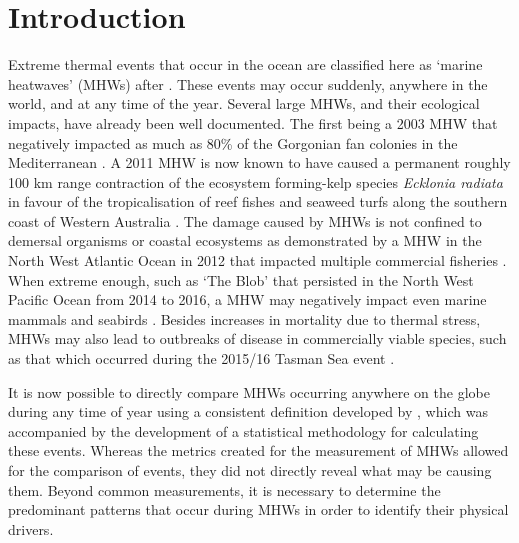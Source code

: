 \documentclass[utf8]{frontiersSCNS}
\begin{document}
\section{Introduction}
Extreme thermal events that occur in the ocean are classified here as `marine heatwaves' (MHWs) after \citet{Hobday2016}. These events may occur suddenly, anywhere in the world, and at any time of the year. Several large MHWs, and their ecological impacts, have already been well documented. The first being a 2003 MHW that negatively impacted as much as 80\% of the Gorgonian fan colonies in the Mediterranean \citep{Garrabou2009}. A 2011 MHW is now known to have caused a permanent roughly 100 km range contraction of the ecosystem forming-kelp species \emph{Ecklonia radiata} in favour of the tropicalisation of reef fishes and seaweed turfs along the southern coast of Western Australia \citep{Wernberg2016}. The damage caused by MHWs is not confined to demersal organisms or coastal ecosystems as demonstrated by a MHW in the North West Atlantic Ocean in 2012 that impacted multiple commercial fisheries \citep{Mills2013}. When extreme enough, such as `The Blob' that persisted in the North West Pacific Ocean from 2014 to 2016, a MHW may negatively impact even marine mammals and seabirds \citep{Cavole2016}. Besides increases in mortality due to thermal stress, MHWs may also lead to outbreaks of disease in commercially viable species, such as that which occurred during the 2015/16 Tasman Sea event \citep{Oliver2017}.

It is now possible to directly compare MHWs occurring anywhere on the globe during any time of year using a consistent definition developed by \citet{Hobday2016}, which was accompanied by the development of a statistical methodology for calculating these events. Whereas the metrics created for the measurement of MHWs allowed for the comparison of events, they did not directly reveal what may be causing them. Beyond common measurements, it is necessary to determine the predominant patterns that occur during MHWs in order to identify their physical drivers.
\end{document}
